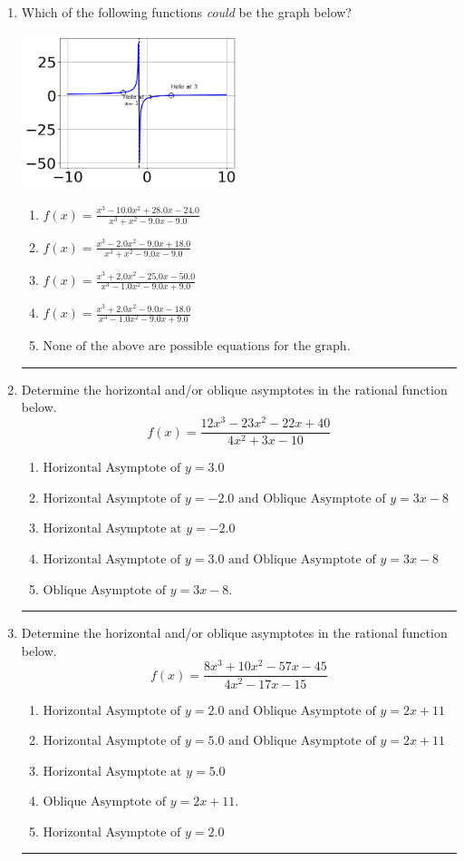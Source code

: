 \documentclass[14pt]{extbook}
\newcommand{\litem}[1]{\item#1\hspace*{-1cm}\rule{\textwidth}{0.4pt}}
\begin{document}
\begin{enumerate}
{\begin{enumerate}[label=\Alph*.]
\end{enumerate} }
\litem{
Which of the following functions \textit{could} be the graph below?
\begin{center}
    \includegraphics[width=0.5\textwidth]{../Figures/identifyGraphOfRationalFunctionCopyA.png}
\end{center}
\begin{enumerate}[label=\Alph*.]
\item \( f(x)=\frac{x^{3} -10.0 x^{2} +28.0 x -24.0}{x^{3} + x^{2} -9.0 x -9.0} \)
\item \( f(x)=\frac{x^{3} -2.0 x^{2} -9.0 x + 18.0}{x^{3} + x^{2} -9.0 x -9.0} \)
\item \( f(x)=\frac{x^{3} +2.0 x^{2} -25.0 x -50.0}{x^{3} -1.0 x^{2} -9.0 x + 9.0} \)
\item \( f(x)=\frac{x^{3} +2.0 x^{2} -9.0 x -18.0}{x^{3} -1.0 x^{2} -9.0 x + 9.0} \)
\item \( \text{None of the above are possible equations for the graph.} \)

\end{enumerate} }
\litem{
Determine the horizontal and/or oblique asymptotes in the rational function below.\[ f(x) = \frac{12x^{3} -23 x^{2} -22 x + 40}{4x^{2} +3 x -10} \]\begin{enumerate}[label=\Alph*.]
\item \( \text{Horizontal Asymptote of } y = 3.0  \)
\item \( \text{Horizontal Asymptote of } y = -2.0 \text{ and Oblique Asymptote of } y = 3x -8 \)
\item \( \text{Horizontal Asymptote at } y = -2.0 \)
\item \( \text{Horizontal Asymptote of } y = 3.0 \text{ and Oblique Asymptote of } y = 3x -8 \)
\item \( \text{Oblique Asymptote of } y = 3x -8. \)

\end{enumerate} }
\litem{
Determine the horizontal and/or oblique asymptotes in the rational function below.\[ f(x) = \frac{8x^{3} +10 x^{2} -57 x -45}{4x^{2} -17 x -15} \]\begin{enumerate}[label=\Alph*.]
\item \( \text{Horizontal Asymptote of } y = 2.0 \text{ and Oblique Asymptote of } y = 2x + 11 \)
\item \( \text{Horizontal Asymptote of } y = 5.0 \text{ and Oblique Asymptote of } y = 2x + 11 \)
\item \( \text{Horizontal Asymptote at } y = 5.0 \)
\item \( \text{Oblique Asymptote of } y = 2x + 11. \)
\item \( \text{Horizontal Asymptote of } y = 2.0  \)


\end{enumerate}}
\end{enumerate}
\end{document}

